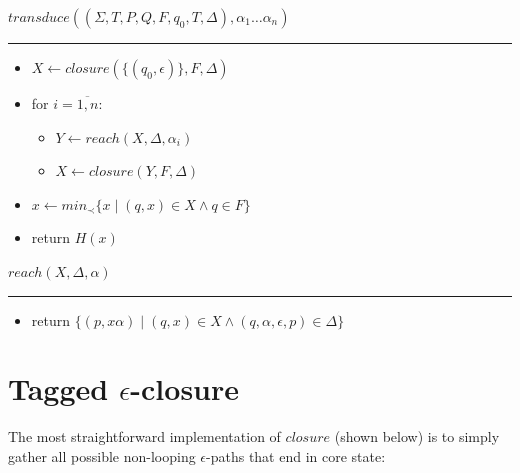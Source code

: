 \documentclass{article}
\newcommand{\Xset}{\!\leftarrow\!}
\newcommand{\Xin}{\!\in\!}
\newcommand{\Xeq}{\!=\!}
\theoremstyle{definition}
\begin{document}
\begin{multicols}{2}
    $transduce((\Sigma, T, P, Q, F, q_0, T, \Delta), \alpha_1 \dots \alpha_n)$
    \hrule
    \begin{itemize}[leftmargin=0in]
        \smallskip
        \item[] $X \Xset closure(\{ (q_0, \epsilon) \}, F, \Delta)$
        \smallskip
        \item[] for $i \Xeq \overline{1,n}$:
        \begin{itemize}
            \item[] $Y \Xset reach(X, \Delta, \alpha_i)$
            \item[] $X \Xset closure(Y, F, \Delta)$
        \end{itemize}
        \item[] $x \Xset min_\prec\{ x \mid (q, x) \Xin X \wedge q \Xin F \}$
        \item[] return $H(x)$
    \end{itemize}

    \bigskip

    $reach(X, \Delta, \alpha)$
    \hrule
    \begin{itemize}[leftmargin=0in]
        \smallskip
        \item[] return $\{ (p, x \alpha) \mid (q, x) \Xin X \wedge (q, \alpha, \epsilon, p) \Xin \Delta \}$
    \end{itemize}

\section{Tagged $\epsilon$-closure}\label{section_closure}

The most straightforward implementation of $closure$ (shown below)
is to simply gather all possible non-looping $\epsilon$-paths that end in core state:

    \bigskip


\end{multicols}
\end{document}
